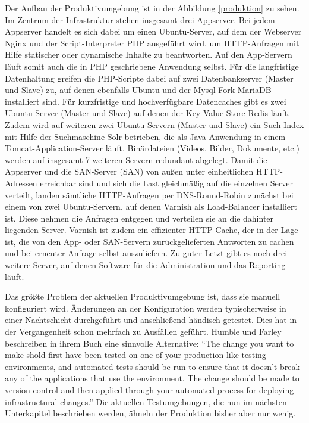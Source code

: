 Der Aufbau der Produktivumgebung ist in der Abbildung \ref{produktion} zu sehen. Im Zentrum der Infrastruktur stehen insgesamt drei Appserver. Bei jedem Appserver handelt es sich dabei um einen Ubuntu-Server, auf dem der Webserver Nginx \citep{nginx:001} und der Script-Interpreter \ac{PHP} \citep{php:001} ausgeführt wird, um HTTP-Anfragen mit Hilfe statischer oder dynamische Inhalte zu beantworten. Auf den App-Servern läuft somit auch die in \ac{PHP} geschriebene Anwendung selbst. Für die langfristige Datenhaltung greifen die PHP-Scripte dabei auf zwei Datenbankserver (Master und Slave) zu, auf denen ebenfalls Ubuntu und der Mysql-Fork MariaDB \citep{mariadb:001} installiert sind. Für kurzfristige und hochverfügbare Datencaches gibt es zwei Ubuntu-Server (Master und Slave) auf denen der Key-Value-Store Redis \citep{redis:001} läuft. Zudem wird auf weiteren zwei Ubuntu-Servern (Master und Slave) ein Such-Index mit Hilfe der Suchmaschine Solr \citep{solr:001} betrieben, die als Java-Anwendung in einem Tomcat-Application-Server \citep{tomcat:001} läuft. Binärdateien (Videos, Bilder, Dokumente, etc.) werden auf insgesamt 7 weiteren Servern redundant abgelegt. Damit die Appserver und die SAN-Server (\acl{SAN}) von außen unter einheitlichen HTTP-Adressen erreichbar sind und sich die Last gleichmäßig auf die einzelnen Server verteilt, landen sämtliche HTTP-Anfragen per DNS-Round-Robin zunächst bei einem von zwei Ubuntu-Servern, auf denen Varnish \citep{varnish:001} als Load-Balancer installiert ist. Diese nehmen die Anfragen entgegen und verteilen sie an die dahinter liegenden Server. Varnish ist zudem ein effizienter HTTP-Cache, der in der Lage ist, die von den App- oder SAN-Servern zurückgelieferten Antworten zu cachen und bei erneuter Anfrage selbst auszuliefern. Zu guter Letzt gibt es noch drei weitere Server, auf denen Software für die Administration und das Reporting läuft.

Das größte Problem der aktuellen Produktivumgebung ist, dass sie manuell konfiguriert wird. Änderungen an der Konfiguration werden typischerweise in einer Nachtschicht durchgeführt und anschließend händisch getestet. Dies hat in der Vergangenheit schon mehrfach zu Ausfällen geführt. Humble und Farley beschreiben in ihrem Buch eine sinnvolle Alternative: "`The change you want to make shold first have been tested on one of your production like testing environments, and automated tests should be run to ensure that it doesn't break any of the applications that use the environment. The change should be made to version control and then applied through your automated process for deploying infrastructural changes."' \citep[S.][S. 287]{HumFar10} Die aktuellen Testumgebungen, die nun im nächsten Unterkapitel beschrieben werden, ähneln der Produktion bisher aber nur wenig.

